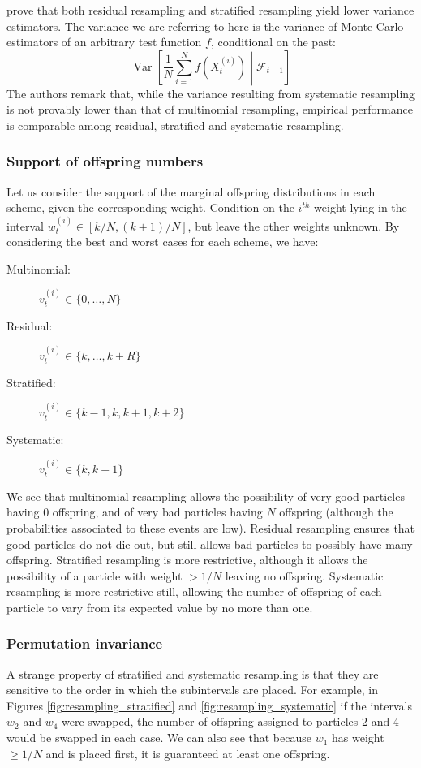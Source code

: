 \documentclass[fleqn]{article}
\theoremstyle{definition}
\newcommand{\V}{\operatorname{Var}}
\newcommand{\F}{\mathcal{F}_{t-1}}
\newcommand{\vt}[2][t]{v_{#1}^{(#2)}}
\newcommand{\wt}[2][t]{w_{#1}^{(#2)}}
\begin{document}
\citet{douc2005} prove that both residual resampling and stratified resampling yield lower variance estimators. 
The variance we are referring to here is the variance of Monte Carlo estimators of an arbitrary test function $f$, conditional on the past:
\begin{equation*}
\V\left[ \frac{1}{N} \sum_{i=1}^N f(X_t^{(i)}) \middle| \F\right]
\end{equation*}
The authors remark that, while the variance resulting from systematic resampling is not provably lower than that of multinomial resampling, empirical performance is comparable among residual, stratified and systematic resampling.

\subsubsection{Support of offspring numbers}
Let us consider the support of the marginal offspring distributions in each scheme, given the corresponding weight. Condition on the $i^{th}$ weight lying in the interval $\wt{i} \in [k/N, (k+1)/N]$, but leave the other weights unknown. By considering the best and worst cases for each scheme, we have: 
\begin{description}
\item[Multinomial:] $\vt{i} \in \{0,\dots, N\}$
\item[Residual:] $\vt{i} \in \{k,\dots, k+R\}$
\item[Stratified:] $\vt{i} \in \{k-1, k, k+1, k+2\}$
\item[Systematic:] $\vt{i} \in \{k, k+1\}$
\end{description}
We see that multinomial resampling allows the possibility of very good particles having $0$ offspring, and of very bad particles having $N$ offspring (although the probabilities associated to these events are low).
Residual resampling ensures that good particles do not die out, but still allows bad particles to possibly have many offspring.
Stratified resampling is more restrictive, although it allows the possibility of a particle with weight $>1/N$ leaving no offspring.
Systematic resampling is more restrictive still, allowing the number of offspring of each particle to vary from its expected value by no more than one.

\subsubsection{Permutation invariance}
A strange property of stratified and systematic resampling is that they are sensitive to the order in which the subintervals are placed. For example, in Figures \ref{fig:resampling_stratified} and \ref{fig:resampling_systematic} if the intervals $w_2$ and $w_4$ were swapped, the number of offspring assigned to particles 2 and 4 would be swapped in each case. 
We can also see that because $w_1$ has weight $\geq 1/N$ and is placed first, it is guaranteed at least one offspring.
\end{document}
